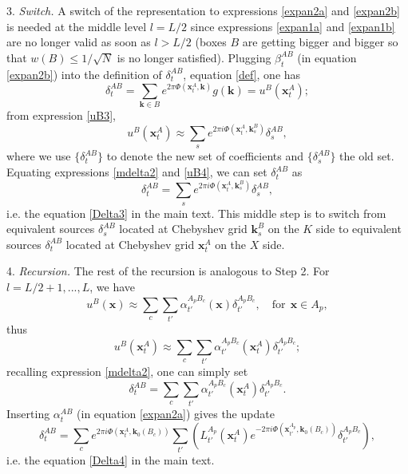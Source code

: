 3. {\it Switch.} A switch of the representation to expressions \ref{expan2a} and \ref{expan2b} is needed at the middle level $l=L/2$ since expressions \ref{expan1a} and \ref{expan1b} are no longer valid as soon as $l>L/2$ (boxes $B$ are getting bigger and bigger so that $w(B)\leq 1/\sqrt{N}$ is no longer satisfied). Plugging $\beta_t^{AB}$ (in equation \ref{expan2b}) into the definition of $\delta_t^{AB}$, equation \ref{def}, one has 
\begin{equation} \label{mdelta2}
\delta_t^{AB}=\sum_{\mathbf{k}\in B}e^{2\pi \Phi(\mathbf{x}_t^A,\mathbf{k})}g(\mathbf{k})=u^B(\mathbf{x}_t^A);
\end{equation}                               
from expression \ref{uB3}, 
\begin{equation} \label{uB4}
u^B(\mathbf{x}_t^A)\approx \sum_s e^{2\pi i
  \Phi(\mathbf{x}_t^A,\mathbf{k}_s^B)}\delta_s^{AB},
\end{equation}
where we use $\{\delta_t^{AB}\}$ to denote the new set of coefficients and $\{\delta_s^{AB}\}$ the old set. Equating expressions \ref{mdelta2} and \ref{uB4}, we can set $\delta_t^{AB}$ as
\begin{equation} \label{delta3}
\delta^{AB}_t=
\sum_s e^{2\pi i \Phi(\mathbf{x}_t^A,\mathbf{k}_s^B)}\delta_s^{AB},
\end{equation}
i.e. the equation \ref{Delta3} in the main text. This middle step is to switch from equivalent sources $\delta_s^{AB}$ located at Chebyshev grid $\mathbf{k}_s^B$ on the $K$ side to equivalent sources $\delta_t^{AB}$ located at Chebyshev grid $\mathbf{x}_t^A$ on the $X$ side.
 
4. {\it Recursion.} The rest of the recursion is analogous to Step 2. For $l=L/2+1,...,L$, we have 
\begin{equation}
u^{B}(\mathbf{x})\approx \sum_c \sum_{t'}
\alpha_{t'}^{A_pB_c}(\mathbf{x})\delta_{t'}^{A_pB_c}, \quad
\text{for} \ \ \mathbf{x}\in A_p,
\end{equation}
thus
\begin{equation} \label{mdelta3}
u^{B}(\mathbf{x}_t^A)\approx \sum_c \sum_{t'}
\alpha_{t'}^{A_pB_c}(\mathbf{x}_t^A)\delta_{t'}^{A_pB_c};
\end{equation}
recalling expression \ref{mdelta2}, one can simply set
\begin{equation}
\delta_t^{AB}=\sum_c \sum_{t'}
\alpha_{t'}^{A_pB_c}(\mathbf{x}_t^A)\delta_{t'}^{A_pB_c}.
\end{equation}
Inserting $\alpha_t^{AB}$ (in equation \ref{expan2a}) gives the update
\begin{equation} \label{delta4}
\delta_t^{AB}=\sum_c  e^{2\pi i
  \Phi(\mathbf{x}_t^A,\mathbf{k}_0(B_c))}\sum_{t'} \left( L_{t'}^{A_p}(\mathbf{x}_t^A) e^{-2\pi i
  \Phi(\mathbf{x}_{t'}^{A_p},\mathbf{k}_0(B_c))}\delta_{t'}^{A_pB_c}\right),
\end{equation}
i.e. the equation \ref{Delta4} in the main text.

